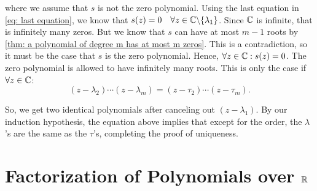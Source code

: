 \begin{prf}
  where we assume that $s$ is not the zero polynomial. Using the last equation in \eqref{eq: last equation}, we know that $s(z) = 0 \quad \forall z \in \mathbb{C} \backslash \{\lambda_1\}$. Since $\mathbb{C}$ is infinite, that is infinitely many zeros. But we know that $s$ can have at most $m-1$ roots by \ref{thm: a polynomial of degree m has at most m zeros}. This is a contradiction, so it must be the case that $s$ is the zero polynomial. Hence, $\forall z \in \mathbb{C}: s(z) = 0$. The zero polynomial is allowed to have infinitely many roots. This is only the case if $\forall z \in \mathbb{C}$:
   \[
     (z - \lambda_2) \cdots (z-\lambda_m) = (z - \tau_2) \cdots (z-\tau_m).
   \]

   So, we get two identical polynomials after canceling out $(z-\lambda_1)$. By our induction hypothesis, the equation above implies that except for the order, the $\lambda$'s are the same as the $\tau$'s, completing the proof of uniqueness.
\end{prf}

\section{Factorization of Polynomials over \texorpdfstring{$\mathbb{R}$}{R}}

